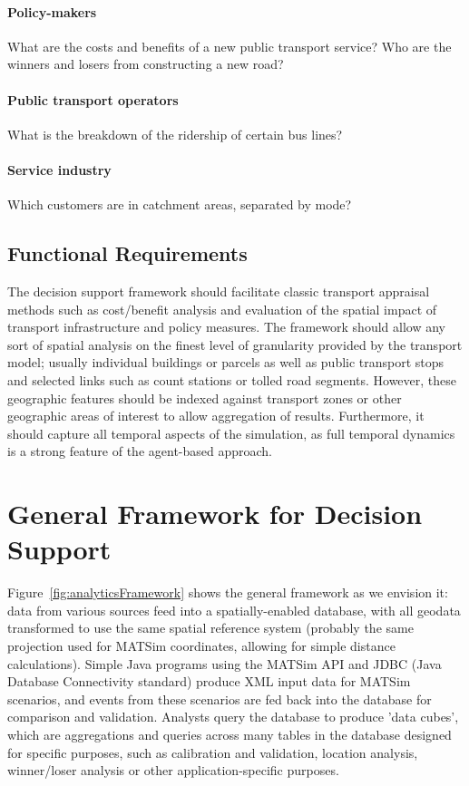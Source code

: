 \paragraph{Policy-makers}
What are the costs and benefits of a new public transport service?
Who are the winners and losers from constructing a new road?
\paragraph{Public transport operators}
What is the breakdown of the ridership of certain bus lines?
\paragraph{Service industry}
Which customers are in catchment areas, separated by mode?

\subsection{Functional Requirements}

The decision support framework should facilitate classic transport
appraisal methods such as cost/benefit analysis and evaluation of the spatial impact of transport
infrastructure and policy measures. The framework should allow any sort of spatial analysis on the finest level of granularity
provided by the transport model; usually individual buildings or parcels as well as public
transport stops and selected links such as count stations or tolled road segments. However, these geographic features should be indexed against transport zones or other geographic areas of interest to allow aggregation of results.
Furthermore, it should capture all temporal aspects of the simulation, as full temporal dynamics is a strong feature of the agent-based approach.

\section{General Framework for Decision Support}
Figure~\ref{fig:analyticsFramework} shows the general framework as we envision it: data from various sources feed into a spatially-enabled database, with all geodata transformed to use the same spatial reference system (probably the same projection used for MATSim coordinates, allowing for simple distance calculations). Simple Java programs using the MATSim API and JDBC (Java Database Connectivity standard) produce XML input data for MATSim scenarios, and events from these scenarios are fed back into the database for comparison and validation. Analysts query the database to produce 'data cubes', which are aggregations and queries across many tables in the database designed for specific purposes, such as calibration and validation, location analysis, winner/loser analysis or other application-specific purposes.

